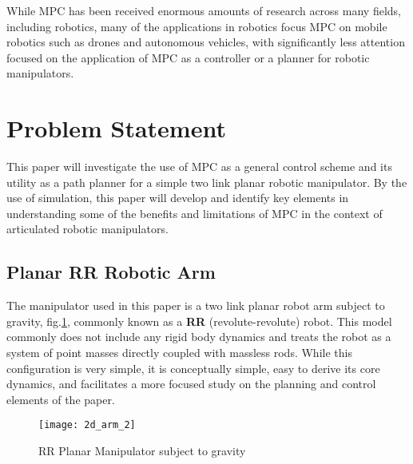 \documentclass[journal]{IEEEtran}
\begin{document}
While MPC has been received enormous amounts of research across many fields, including  robotics, many of the applications in robotics focus MPC on mobile robotics such as drones and autonomous vehicles, with significantly less attention focused on the application of MPC as a controller or a planner for robotic manipulators.

\section{Problem Statement}

This paper will investigate the use of MPC as a general control scheme and its utility as a path planner for a simple two link planar robotic manipulator. By the use of simulation, this paper will develop and identify key elements in understanding some of the benefits and limitations of MPC in the context of articulated robotic manipulators.

\subsection{Planar RR Robotic Arm}

The manipulator used in this paper is a two link planar robot arm subject to gravity, fig.\ref{RRrobot}, commonly known as a \textbf{RR} (revolute-revolute) robot. This model commonly does not include any rigid body dynamics and treats the robot as a system of point masses directly coupled with massless rods. While this configuration is very simple, it is conceptually simple, easy to derive its core dynamics, and facilitates a more focused study on the planning and control elements of the paper. \\

\begin{figure}
    \centering
    \texttt{[image: 2d\_arm\_2]}
    \caption{RR Planar Manipulator subject to gravity}
    \label{RRrobot}
\end{figure}
\end{document}
